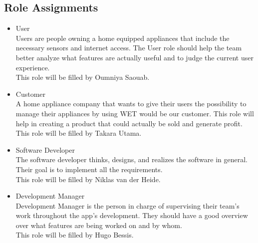 \documentclass[10pt]{article}
\begin{document}
\begin{multicols*}{2}

\section{Role Assignments}

\begin{itemize}
  \item {User} \\
  Users are people owning a home equipped appliances that include the necessary sensors and internet access. The User role should help the team better analyze what features are actually useful and to judge the current user experience.\\
  This role will be filled by Oumniya Saouab.
  \item {Customer} \\
  A home appliance company that wants to give their users the possibility to manage their appliances by using WET would be our customer. This role will help in creating a product that could actually be sold and generate profit.\\
  This role will be filled by Takara Utama.
  \item {Software Developer} \\
  The software developer thinks, designs, and realizes the software in general. Their goal is to implement all the requirements.\\
  This role will be filled by Niklas van der Heide.
  \item {Development Manager} \\
  Development Manager is the person in charge of supervising their team's work throughout the app's development. They should have a good overview over what features are being worked on and by whom.\\
  This role will be filled by Hugo Bessis.
\end{itemize}


\end{multicols*}
\end{document}
